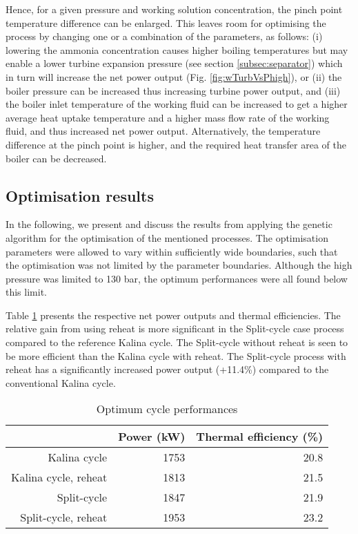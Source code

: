 \documentclass[review,3p]{elsarticle}
\begin{document}
Hence, for a given pressure and working solution concentration, the pinch point temperature difference can be enlarged. This leaves room for optimising the process by changing one or a combination of the parameters, as follows: (i) lowering the ammonia concentration causes higher boiling temperatures but may enable a lower turbine expansion pressure (see section \ref{subsec:separator}) which in turn will increase the net power output (Fig. \ref{fig:wTurbVsPhigh}), or (ii) the boiler pressure can be increased thus increasing turbine power output, and (iii) the boiler inlet temperature of the working fluid can be increased to get a higher average heat uptake temperature and a higher mass flow rate of the working fluid, and thus increased net power output. Alternatively, the temperature difference at the pinch point is higher, and the required heat transfer area of the boiler can be decreased.



\subsection{Optimisation results}
In the following, we present and discuss the results from applying the genetic algorithm for the optimisation of the mentioned processes. The optimisation parameters were allowed to vary within sufficiently wide boundaries, such that the optimisation was not limited by the parameter boundaries. Although the high pressure was limited to 130 bar, the optimum performances were all found below this limit.

Table \ref{tab:cyclePerformance} presents the respective net power outputs and thermal efficiencies. The relative gain from using reheat is more significant in the Split-cycle case process compared to the reference Kalina cycle. The Split-cycle without reheat is seen to be more efficient than the Kalina cycle with reheat. The Split-cycle process with reheat has a significantly increased power output (+11.4\%) compared to the conventional Kalina cycle. 


\begin{table}
\centering
\caption{Optimum cycle performances}
%
\scriptsize
\begin{tabular}{rrr}
\toprule
           & Power (kW) & Thermal efficiency (\%)\\
\midrule
Kalina cycle &       1753 &       20.8 \\
Kalina cycle, reheat &       1813 &       21.5 \\
Split-cycle &       1847 &       21.9 \\
Split-cycle, reheat &       1953 &       23.2 \\
\bottomrule
\end{tabular}  
\label{tab:cyclePerformance}
\end{table}
\end{document}
